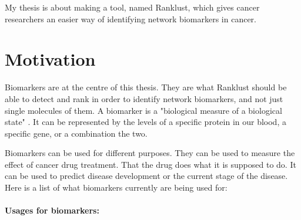 \documentclass[UKenglish]{ifimaster}
\begin{document}
My thesis is about making a tool, named Ranklust, which gives cancer researchers an easier way of identifying network
biomarkers in cancer. 

\chapter{Motivation}
Biomarkers are at the centre of this thesis. They are what Ranklust should be able to detect and rank in order to
identify network biomarkers, and not just single molecules of them. A biomarker is a "biological measure of a biological
state" \cite{biomarker1}. It can be represented by the levels of a specific protein in our blood, a specific gene, or a
combination the two.

Biomarkers can be used for different purposes. They can be used to measure the effect of cancer drug treatment. That the
drug does what it is supposed to do. It can be used to predict disease development or the current stage of the disease.
Here is a list of what biomarkers currently are being used for:
\\\\
\textbf{Usages for biomarkers:} \cite{beyondpsa}
\end{document}
